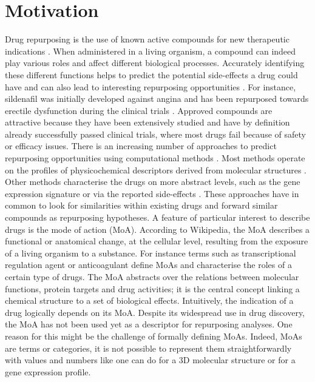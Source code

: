 \documentclass{bioinfo}
\begin{document}
\section{Motivation}

Drug repurposing is the use of known active compounds for new therapeutic indications \citep{Sanseau01072011}. 
When administered in a living organism, a compound can indeed play various roles and affect different biological processes. 
Accurately identifying these different functions helps to predict the potential side-effects a drug could have and can also lead to 
interesting repurposing opportunities \citep{Medina-Franco2013}. For instance, sildenafil was initially developed 
against angina and has been repurposed towards erectile dysfunction during the clinical trials \citep{Ashburn2004}. Approved compounds are 
attractive because they have been extensively studied and have by definition already successfully passed clinical trials, where 
most drugs fail because of safety or efficacy issues.
There is an increasing number of approaches to predict repurposing opportunities using computational methods \citep{Sanseau01072011}. Most 
methods operate on the profiles of physicochemical descriptors derived from molecular structures \citep{Haupt2011}. Other methods characterise 
the drugs on more abstract levels, such as the gene expression signature \citep{Iorio2010} or 
via the reported side-effects \citep{Campillos2008}. 
These approaches 
have in common to look for similarities within existing drugs and forward similar compounds as repurposing hypotheses.
A feature of particular interest to describe drugs is the mode of action (MoA). According to Wikipedia, 
the MoA describes a functional or anatomical change, 
at the cellular level, resulting from the exposure of a living organism to a substance. For instance 
terms such as transcriptional regulation agent or anticoagulant define MoAs and characterise the roles of a certain type of drugs. The 
MoA abstracts over the relations between molecular functions, protein targets and drug activities; it is the central concept linking a 
chemical structure to a set of biological effects. Intuitively, the indication of a drug logically depends on its MoA.
Despite its widespread use in drug discovery, the MoA has not been used yet as a descriptor for repurposing analyses. One reason for this 
might be the challenge of formally defining MoAs. Indeed, MoAs are terms or categories, it is not possible to represent 
them straightforwardly with values and numbers like one can do for a 3D molecular structure or for a gene expression profile. 
\end{document}
